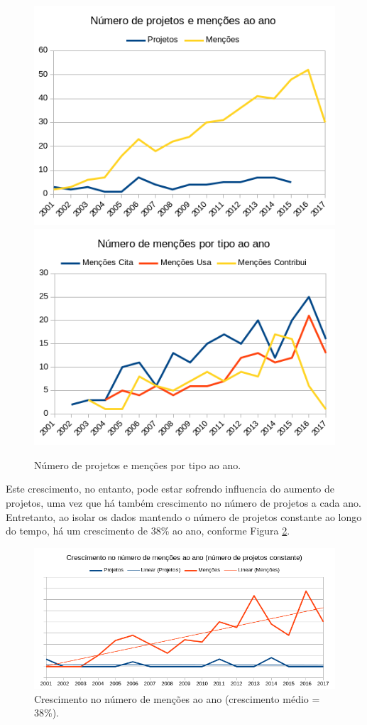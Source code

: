 \begin{figure}[h]
  \centering
  \includegraphics[scale=0.6]{imagens/mentions-projects-by-year.png}
  \includegraphics[scale=0.6]{imagens/mentions-type-by-year.png}
  \caption{Número de projetos e menções por tipo ao ano.}
  \label{mentions-by-year}
\end{figure}

Este crescimento, no entanto, pode estar sofrendo influencia do aumento de
projetos, uma vez que há também crescimento no número de projetos a cada ano.
Entretanto, ao isolar os dados mantendo o número de projetos constante ao longo
do tempo, há um crescimento de 38\% ao ano, conforme Figura
\ref{mentions-trend}.

\begin{figure}[h]
  \center
  \includegraphics[scale=0.6]{imagens/mentions-trend.png}
  \caption{Crescimento no número de menções ao ano (crescimento médio = 38\%).}
  \label{mentions-trend}
\end{figure}

